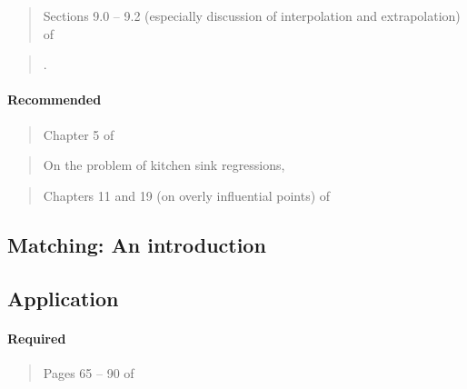 \documentclass[12pt]{article}
\newcommand{\bibverse}[1]{\begin{verse} \bibentry{#1}. \end{verse}}
\begin{document}
\begin{verse}  \end{verse}

\begin{verse} Sections 9.0 -- 9.2 (especially discussion of interpolation and extrapolation) of  \end{verse}

\bibverse{berk2010}

\paragraph*{Recommended}

\begin{verse} Chapter 5 of  \end{verse}

\begin{verse}  \end{verse}

\begin{verse} On the problem of kitchen sink regressions,  \end{verse}

\begin{verse} Chapters 11 and 19 (on overly influential points) of  \end{verse}

\subsection{Matching: An introduction}

\subsection*{Application}

\begin{verse}  \end{verse}

\paragraph*{Required}

\begin{verse}
  Pages 65 -- 90 of 
\end{verse}

\begin{verse}
\end{verse}
\end{document}
